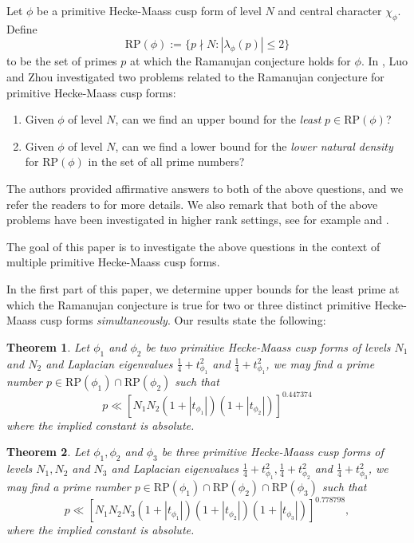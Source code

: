 \documentclass[10pt,leqno]{amsart}
\theoremstyle{plain}
\newtheorem{theorem}{Theorem}
\theoremstyle{definition}
\theoremstyle{remark}
\numberwithin{equation}{section}
\newcommand{\RP}{\text{RP}}
\begin{document}
Let $\phi$ be a primitive Hecke-Maass cusp form of level $N$ and central character $\chi_{\phi}$. Define 
\begin{equation*}
    \RP(\phi) := \{p\nmid N: |\lambda_\phi(p)| \leq 2\} 
\end{equation*}
to be the set of primes $p$ at which the Ramanujan conjecture holds for $\phi$.
In \cite{LuoZhouMR3928043}, Luo and Zhou investigated two problems related to the Ramanujan conjecture for primitive Hecke-Maass cusp forms:
\begin{enumerate}
  \item Given $\phi$ of level $N$, can we find an upper bound for the \textit{least} $p \in \RP(\phi)$?
    \item Given $\phi$ of level $N$, can we find a lower bound for the \textit{lower natural density} for $\RP(\phi)$ in the set of all prime numbers?
\end{enumerate}    
The authors provided affirmative answers to both of the above questions, and we refer the readers to \cite[Theorem 1, Theorem 2]{LuoZhouMR3928043} for more details.
We also remark that both of the above problems have been investigated in higher rank settings, see for example \cite[Theorem B]{YangMR4549878} and \cite[Theorem 1.2]{LauNgWangMR4282084}.


The goal of this paper is to investigate the above questions in the context of multiple primitive Hecke-Maass cusp forms. 


In the first part of this paper, we determine upper bounds for the least prime at which the Ramanujan conjecture is true for two or three distinct primitive Hecke-Maass cusp forms \textit{simultaneously}. 
Our results state the following:
\begin{theorem}\label{1Theorem1smallestRCprime}
    Let $\phi_1$ and $\phi_2$ be two primitive Hecke-Maass cusp forms of levels $N_1$ and $N_2$ and Laplacian eigenvalues $\frac{1}{4} + t_{\phi_1}^2$ and $\frac{1}{4} + t_{\phi_1}^2$, we may find a prime number $p\in \RP(\phi_1)\cap \RP(\phi_2)$ such that 
    \[
        p \ll [N_1N_2(1 + |t_{\phi_1}|)(1 + |t_{\phi_2}|)]^{0.447374}
    \]
    where the implied constant is absolute.
\end{theorem}

\begin{theorem}\label{2Theorem1smallestRCprime}
    Let $\phi_1, \phi_2$ and $\phi_3$ be three primitive Hecke-Maass cusp forms of levels $N_1,N_2$ and $N_3$ and Laplacian eigenvalues $\frac{1}{4} + t_{\phi_1}^2, \frac{1}{4} + t_{\phi_2}^2$ and $\frac{1}{4} + t_{\phi_3}^2$, we may find a prime number $p\in \RP(\phi_1)\cap\RP(\phi_2)\cap\RP(\phi_3)$ such that 
    \[
        p \ll [N_1N_2N_3(1 + |t_{\phi_1}|)(1 + |t_{\phi_2}|)(1 + |t_{\phi_3}|)]^{0.778798},
    \]
    where the implied constant is absolute.
\end{theorem}
\end{document}
